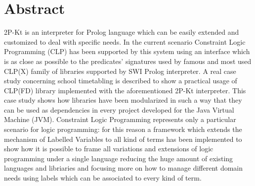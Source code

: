 
\cleardoublepage
{}
{}
\begingroup
\let\clearpage\relax
\let\cleardoublepage\relax
\let\cleardoublepage\relax

\chapter*{Abstract}

%
%
2P-Kt is an interpreter for Prolog language which can be easily extended and customized to deal with
specific needs. In the current scenario Constraint Logic Programming (CLP) has been supported by this system using an interface which is
as close as possible to the predicates' signatures used by famous and most used CLP(X) family of libraries supported by SWI Prolog interpreter.\newline
A real case study concerning school timetabling is described to show a practical usage of CLP(FD) library implemented with the aforementioned 2P-Kt interpreter.
This case study shows how libraries have been modularized in such a way that they can be used as dependencies in every project developed for the Java
Virtual Machine (JVM).\newline
Constraint Logic Programming represents only a particular scenario for logic programming: for this reason a framework which extends the
mechanism of Labelled Variables to all kind of terms has been implemented to show how it is possible to frame all variations and extensions of logic programming under a
single language reducing the huge amount of existing languages and libriaries and focusing more on how to manage different domain needs using labels
which can be associated to every kind of term.
\endgroup

\vfill


